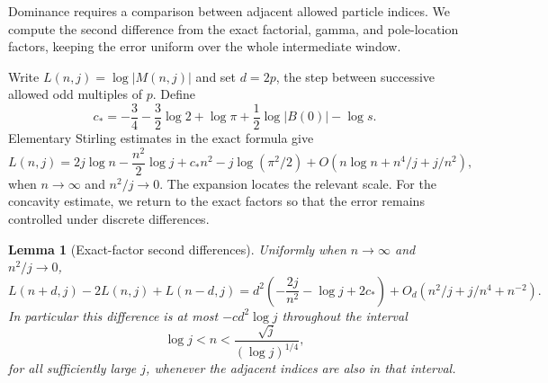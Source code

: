 \documentclass[11pt]{article}
\numberwithin{equation}{section}
\newtheorem{lemma}[theorem]{Lemma}
\theoremstyle{definition}
\begin{document}
Dominance requires a comparison between adjacent allowed particle
indices. We compute the second difference from the exact factorial,
gamma, and pole-location factors, keeping the error uniform over the
whole intermediate window.

Write $L(n,j)=\log|M(n,j)|$ and set $d=2p$, the step between
successive allowed odd multiples of $p$. Define
\begin{equation}\label{eq:jets_c0}
 c_*=-\frac34-\frac32\log2+\log\pi
       +\frac12\log|B(0)|-\log s.
\end{equation}
Elementary Stirling estimates in the exact formula give
\begin{equation}\label{eq:jets_L_expansion}
 L(n,j)=2j\log n-\frac{n^2}2\log j+c_*n^2
       -j\log(\pi^2/2)
       +O(n\log n+n^4/j+j/n^2),
\end{equation}
when $n\to\infty$ and $n^2/j\to0$.
The expansion locates the relevant scale. For the concavity estimate,
we return to the exact factors so that the error remains controlled
under discrete differences.

\begin{lemma}[Exact-factor second differences]
\label{lem:jets_discrete_concavity}
Uniformly when $n\to\infty$ and $n^2/j\to0$,
\begin{equation}\label{eq:jets_second_difference}
 L(n+d,j)-2L(n,j)+L(n-d,j)
 =d^2\left(-\frac{2j}{n^2}-\log j+2c_*\right)
  +O_d(n^2/j+j/n^4+n^{-2}).
\end{equation}
In particular this difference is at most $-c d^2\log j$ throughout
the interval
\begin{equation}\label{eq:jets_middle_window}
 \log j<n<\frac{\sqrt j}{(\log j)^{1/4}},
\end{equation}
for all sufficiently large $j$, whenever the adjacent indices are
also in that interval.
\end{lemma}
\end{document}
